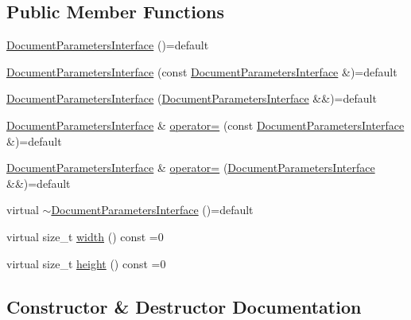 \subsection*{Public Member Functions}
\begin{DoxyCompactItemize}
\item 
\hyperlink{classGraphicalEditorCore_1_1DocumentParametersInterface_aea8d5f5d01c0046d0bc2adad22487b23}{Document\+Parameters\+Interface} ()=default
\item 
\hyperlink{classGraphicalEditorCore_1_1DocumentParametersInterface_a95795d8f0e1cb69c18b468739325a0bb}{Document\+Parameters\+Interface} (const \hyperlink{classGraphicalEditorCore_1_1DocumentParametersInterface}{Document\+Parameters\+Interface} \&)=default
\item 
\hyperlink{classGraphicalEditorCore_1_1DocumentParametersInterface_a72b15c164f9f457c29d314ba6762fd84}{Document\+Parameters\+Interface} (\hyperlink{classGraphicalEditorCore_1_1DocumentParametersInterface}{Document\+Parameters\+Interface} \&\&)=default
\item 
\hyperlink{classGraphicalEditorCore_1_1DocumentParametersInterface}{Document\+Parameters\+Interface} \& \hyperlink{classGraphicalEditorCore_1_1DocumentParametersInterface_aa5a6d4d881b9812f8406f01ec1e20e50}{operator=} (const \hyperlink{classGraphicalEditorCore_1_1DocumentParametersInterface}{Document\+Parameters\+Interface} \&)=default
\item 
\hyperlink{classGraphicalEditorCore_1_1DocumentParametersInterface}{Document\+Parameters\+Interface} \& \hyperlink{classGraphicalEditorCore_1_1DocumentParametersInterface_a43e956fc79f52aff91ea8e2d0b952e5c}{operator=} (\hyperlink{classGraphicalEditorCore_1_1DocumentParametersInterface}{Document\+Parameters\+Interface} \&\&)=default
\item 
virtual \hyperlink{classGraphicalEditorCore_1_1DocumentParametersInterface_a17f379e6cde775c74283e90d046372e4}{$\sim$\+Document\+Parameters\+Interface} ()=default
\item 
virtual size\+\_\+t \hyperlink{classGraphicalEditorCore_1_1DocumentParametersInterface_a8e96d1aa50d0b2bd3ef21fafaeaa4261}{width} () const =0
\item 
virtual size\+\_\+t \hyperlink{classGraphicalEditorCore_1_1DocumentParametersInterface_a1a3f45e27f2c9b11d04b2fe562323bb2}{height} () const =0
\end{DoxyCompactItemize}


\subsection{Constructor \& Destructor Documentation}
